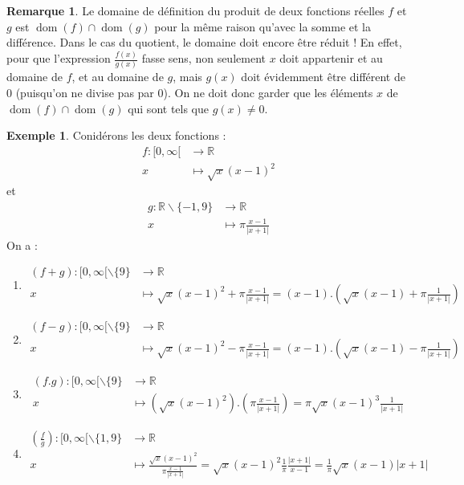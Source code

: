 \documentclass[a4paper,13pt]{scrreprt}
\theoremstyle{plain}
\theoremstyle{definition}
\newtheorem{exe}[subsection]{Exemple}
\newtheorem{rema}[subsection]{Remarque}
\newcommand{\rr}{\mathbb{R}}
\DeclareMathOperator{\dom}{dom}
\begin{document}
\begin{rema}
	Le domaine de définition du produit de deux fonctions réelles $f$ et $g$ est $\dom (f) \cap \dom (g)$ pour la même raison qu'avec la somme et la différence. Dans le cas du quotient, le domaine doit encore être réduit ! En effet, pour que l'expression $\frac{f(x)}{g(x)}$ fasse sens, non seulement $x$ doit appartenir et au domaine de $f$, et au domaine de $g$, mais $g(x)$ doit évidemment être différent de $0$ (puisqu'on ne divise pas par $0$). On ne doit donc garder que les éléments $x$ de $\dom (f) \cap \dom (g)$ qui sont tels que $g(x) \neq 0$.
\end{rema}
\begin{exe}
	Conidérons les deux fonctions : \begin{align*}
	f : [0,\infty[ &\to \rr \\
	x &\mapsto \sqrt{x}(x-1)^2
	\end{align*}
	et
	\begin{align*}
	g : \rr \backslash \{-1,9\} &\to \rr \\
	x &\mapsto \pi \frac{x-1}{|x+1|}
	\end{align*}
	On a :
	\begin{enumerate}
		\item \begin{align*}
		(f+g) : [0,\infty[ \backslash \{9\} &\to \rr \\
		x &\mapsto \sqrt{x}(x-1)^2 + \pi \frac{x-1}{|x+1|} = (x-1).(\sqrt{x}(x-1)+\pi \frac{1}{|x+1|})
		\end{align*}
		\item \begin{align*}
		(f-g) : [0,\infty[ \backslash \{9\} &\to \rr \\
		x &\mapsto \sqrt{x}(x-1)^2 - \pi \frac{x-1}{|x+1|} = (x-1).(\sqrt{x}(x-1)-\pi \frac{1}{|x+1|})
		\end{align*}
		\item \begin{align*}
		(f.g) : [0,\infty[ \backslash \{9\} &\to \rr \\
		x &\mapsto (\sqrt{x}(x-1)^2).(\pi \frac{x-1}{|x+1|}) = \pi \sqrt{x}(x-1)^3  \frac{1}{|x+1|}
		\end{align*}
		\item \begin{align*}
		\left(\frac{f}{g}\right) : [0,\infty[ \backslash \{1,9\} &\to \rr \\
		x &\mapsto \frac{\sqrt{x}(x-1)^2}{\pi \frac{x-1}{|x+1|}} = \sqrt{x}(x-1)^2 \frac{1}{\pi}\frac{|x+1|}{x-1} = \frac{1}{\pi} \sqrt{x}(x-1)|x+1|
		\end{align*}
	\end{enumerate}
\end{exe}
\end{document}
